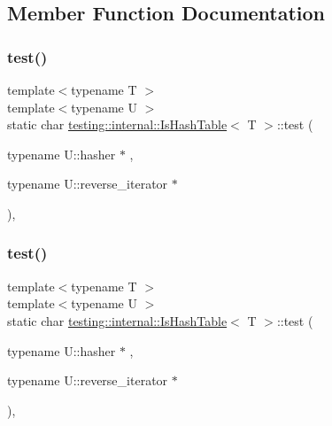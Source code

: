 \subsection{Member Function Documentation}
\mbox{\label{structtesting_1_1internal_1_1_is_hash_table_acc4d1e2307a1e0527932da7a7d354f06}} 
\subsubsection{\texorpdfstring{test()}{test()}\hspace{0.1cm}{\footnotesize\ttfamily [1/9]}}
{\footnotesize\ttfamily template$<$typename T $>$ \\
template$<$typename U $>$ \\
static char \mbox{\hyperlink{structtesting_1_1internal_1_1_is_hash_table}{testing\+::internal\+::\+Is\+Hash\+Table}}$<$ T $>$\+::test (\begin{DoxyParamCaption}\item[{typename U\+::hasher $\ast$}]{,  }\item[{typename U\+::reverse\+\_\+iterator $\ast$}]{ }\end{DoxyParamCaption})\hspace{0.3cm}{\ttfamily [static]}, {\ttfamily [private]}}

\mbox{\label{structtesting_1_1internal_1_1_is_hash_table_acc4d1e2307a1e0527932da7a7d354f06}} 
\subsubsection{\texorpdfstring{test()}{test()}\hspace{0.1cm}{\footnotesize\ttfamily [2/9]}}
{\footnotesize\ttfamily template$<$typename T $>$ \\
template$<$typename U $>$ \\
static char \mbox{\hyperlink{structtesting_1_1internal_1_1_is_hash_table}{testing\+::internal\+::\+Is\+Hash\+Table}}$<$ T $>$\+::test (\begin{DoxyParamCaption}\item[{typename U\+::hasher $\ast$}]{,  }\item[{typename U\+::reverse\+\_\+iterator $\ast$}]{ }\end{DoxyParamCaption})\hspace{0.3cm}{\ttfamily [static]}, {\ttfamily [private]}}

